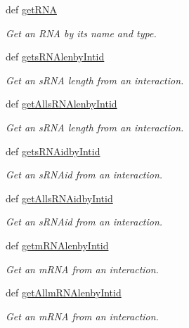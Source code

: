 \begin{DoxyCompactItemize}
\item 
def \hyperlink{classMycarn_1_1Sqlite__manager_1_1Sqlite__manager_ae0f0c220e76ec285c40cfd2ff36062fc}{get\-R\-N\-A}
\begin{DoxyCompactList}\small\item\em \-Get an \-R\-N\-A by its name and type. \end{DoxyCompactList}\item 
def \hyperlink{classMycarn_1_1Sqlite__manager_1_1Sqlite__manager_a4c7689effbf53bd2dcacf0e9d0cfd700}{gets\-R\-N\-Alenby\-Intid}
\begin{DoxyCompactList}\small\item\em \-Get an s\-R\-N\-A length from an interaction. \end{DoxyCompactList}\item 
def \hyperlink{classMycarn_1_1Sqlite__manager_1_1Sqlite__manager_a81f1460be5980e3385af5e420e48c519}{get\-Alls\-R\-N\-Alenby\-Intid}
\begin{DoxyCompactList}\small\item\em \-Get an s\-R\-N\-A length from an interaction. \end{DoxyCompactList}\item 
def \hyperlink{classMycarn_1_1Sqlite__manager_1_1Sqlite__manager_a5cde004d38cbe84c9bad375e03349587}{gets\-R\-N\-Aidby\-Intid}
\begin{DoxyCompactList}\small\item\em \-Get an s\-R\-N\-Aid from an interaction. \end{DoxyCompactList}\item 
def \hyperlink{classMycarn_1_1Sqlite__manager_1_1Sqlite__manager_ab95f8a4ad44cf23a1d49378ec070446c}{get\-Alls\-R\-N\-Aidby\-Intid}
\begin{DoxyCompactList}\small\item\em \-Get an s\-R\-N\-Aid from an interaction. \end{DoxyCompactList}\item 
def \hyperlink{classMycarn_1_1Sqlite__manager_1_1Sqlite__manager_ad3760b008e8f541011855634d37a7bf9}{getm\-R\-N\-Alenby\-Intid}
\begin{DoxyCompactList}\small\item\em \-Get an m\-R\-N\-A from an interaction. \end{DoxyCompactList}\item 
def \hyperlink{classMycarn_1_1Sqlite__manager_1_1Sqlite__manager_a29df0dcc57a51a268a7b358403220680}{get\-Allm\-R\-N\-Alenby\-Intid}
\begin{DoxyCompactList}\small\item\em \-Get an m\-R\-N\-A from an interaction. \end{DoxyCompactList}\item 

\end{DoxyCompactItemize}
